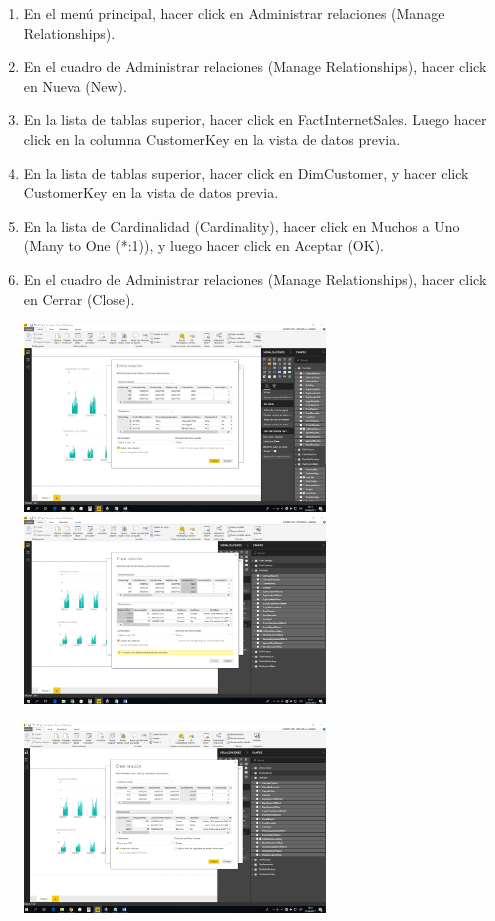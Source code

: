 \begin{itemize}
\begin{enumerate}
\item En el menú principal, hacer click en Administrar relaciones (Manage Relationships).
\item En el cuadro de Administrar relaciones (Manage Relationships), hacer click en Nueva (New).
\item En la lista de tablas superior, hacer click en FactInternetSales. Luego hacer click en la columna
CustomerKey en la vista de datos previa.
\item En la lista de tablas superior, hacer click en DimCustomer, y hacer click CustomerKey en la vista de datos
previa.
\item En la lista de Cardinalidad (Cardinality), hacer click en Muchos a Uno (Many to One (*:1)), y luego hacer
click en Aceptar (OK).
\item En el cuadro de Administrar relaciones (Manage Relationships), hacer click en Cerrar (Close).

\includegraphics[width=8cm]{./Imagenes/5.png} \includegraphics[width=8cm]{./Imagenes/6.png}
\begin{center}
\includegraphics[width=8cm]{./Imagenes/7.png} 
\end{center}


\end{enumerate}
\end{itemize}
